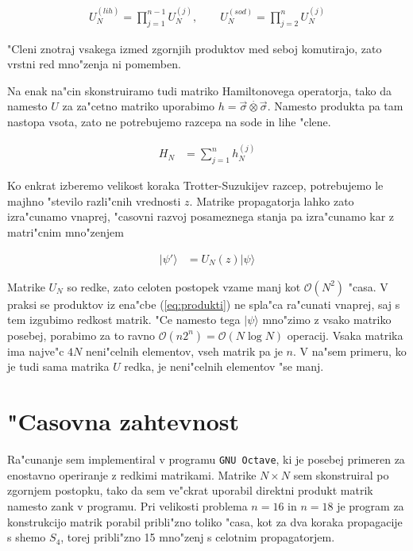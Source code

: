 \documentclass[a4paper,10pt]{article}
\begin{document}
\begin{align}
\label{eq:produkti}
 U_N^{(lih)} = \prod_{j=1}^{n-1} U_N^{(j)}, \qquad U_N^{(sod)} = \prod_{j=2}^{n} U_N^{(j)} 
\end{align}

"Cleni znotraj vsakega izmed zgornjih produktov med seboj komutirajo, zato vrstni red mno"zenja ni pomemben. 

Na enak na"cin skonstruiramo tudi matriko Hamiltonovega operatorja, tako da namesto $U$ za za"cetno matriko uporabimo $h = \vec{\sigma} \stackrel{\cdot}{\otimes} \vec{\sigma}$. 
Namesto produkta pa tam nastopa vsota, zato ne potrebujemo razcepa na sode in lihe "clene. 

\begin{align}
 H_N &= \sum_{j=1}^{n} h_N^{(j)}
\end{align}

Ko enkrat izberemo velikost koraka Trotter-Suzukijev razcep, potrebujemo le majhno "stevilo razli"cnih vrednosti $z$. 
Matrike propagatorja lahko zato izra"cunamo vnaprej, "casovni razvoj posameznega stanja pa izra"cunamo kar z matri"cnim mno"zenjem

\begin{align}
 |\psi'\rangle &= U_N(z) |\psi\rangle
\end{align}

Matrike $U_N$ so redke, zato celoten postopek vzame manj kot $\mathcal{O}(N^2)$ "casa. 
V praksi se produktov iz ena"cbe (\ref{eq:produkti}) ne spla"ca ra"cunati vnaprej, saj s tem izgubimo redkost matrik. 
"Ce namesto tega $|\psi\rangle$ mno"zimo z vsako matriko posebej, porabimo za to ravno $\mathcal{O}(n2^n) = \mathcal{O}(N\log N)$ operacij. 
Vsaka matrika ima najve"c $4N$ neni"celnih elementov, vseh matrik pa je $n$. 
V na"sem primeru, ko je tudi sama matrika $U$ redka, je neni"celnih elementov "se manj. 

\section{"Casovna zahtevnost}

Ra"cunanje sem implementiral v programu \texttt{GNU Octave}, ki je posebej primeren za enostavno operiranje z redkimi matrikami. 
Matrike $N \times N$ sem skonstruiral po zgornjem postopku, tako da sem ve"ckrat uporabil direktni produkt matrik namesto zank v programu. 
Pri velikosti problema $n=16$ in $n=18$ je program za konstrukcijo matrik porabil pribli"zno toliko "casa, kot za dva koraka propagacije s shemo $S_4$, torej pribli"zno 15 mno"zenj s celotnim propagatorjem. 
\end{document}
